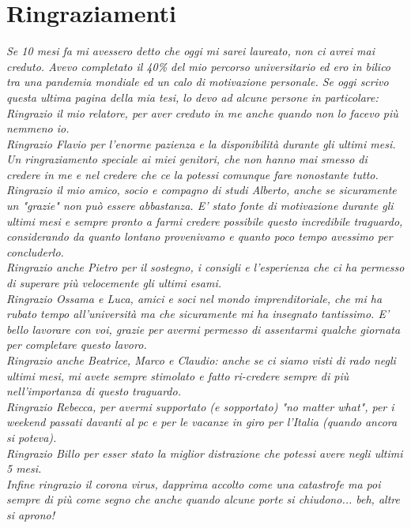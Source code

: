 \chapter*{Ringraziamenti}
\thispagestyle{empty}
\begin{flushright}
	\textit{Se 10 mesi fa mi avessero detto che oggi mi sarei laureato, non ci avrei mai creduto. Avevo completato il 40\% del mio percorso universitario ed ero in bilico tra una pandemia mondiale ed un calo di motivazione personale.
	Se oggi scrivo questa ultima pagina della mia tesi, lo devo ad alcune persone in particolare:\\	
		 Ringrazio il mio relatore, per aver creduto in me anche quando non lo facevo più nemmeno io.\\Ringrazio {\normalfont Flavio} per l'enorme pazienza e la disponibilità durante gli ultimi mesi.\\Un ringraziamento speciale ai miei genitori, che non hanno mai smesso di credere in me e nel credere che ce la potessi comunque fare nonostante tutto.\\
		 Ringrazio il mio amico, socio e compagno di studi {\normalfont Alberto}, anche se sicuramente un "grazie" non può essere abbastanza. E' stato fonte di motivazione durante gli ultimi mesi e sempre pronto a farmi credere possibile questo incredibile traguardo, considerando da quanto lontano provenivamo e quanto poco tempo avessimo per concluderlo.\\
		 Ringrazio anche {\normalfont Pietro} per il sostegno, i consigli e l'esperienza che ci ha permesso di superare più velocemente gli ultimi esami.\\
		Ringrazio {\normalfont Ossama} e {\normalfont Luca}, amici e soci nel mondo imprenditoriale, che mi ha rubato tempo all'università ma che sicuramente mi ha insegnato tantissimo. E' bello lavorare con voi, grazie per avermi permesso di assentarmi qualche giornata per completare questo lavoro.\\
		Ringrazio anche {\normalfont Beatrice}, {\normalfont Marco} e {\normalfont Claudio}: anche se ci siamo visti di rado negli ultimi mesi, mi avete sempre stimolato e fatto ri-credere sempre di più nell'importanza di questo traguardo.\\
		Ringrazio {\normalfont Rebecca}, per avermi supportato (e sopportato) "no matter what", per i weekend passati davanti al pc e per le vacanze in giro per l'Italia (quando ancora si poteva).\\
		Ringrazio {\normalfont Billo} per esser stato la miglior distrazione che potessi avere negli ultimi 5 mesi.\\
		Infine ringrazio il corona virus, dapprima accolto come una catastrofe ma poi sempre di più come segno che anche quando alcune porte si chiudono... beh, altre si aprono!}
\end{flushright}
